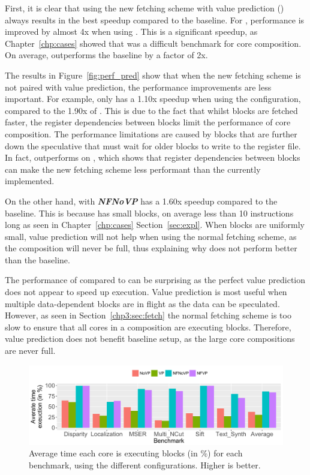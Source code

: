 First, it is clear that using the new fetching scheme with value prediction (\nfvp) always results in the best speedup compared to the baseline.
For , performance is improved by almost 4x when using \nfvp.
This is a significant speedup, as Chapter~\ref{chp:cases} showed that  was a difficult benchmark for core composition.
On average, \nfvp{} outperforms the baseline by a factor of 2x.

The results in Figure~\ref{fig:perf_pred} show that when the new fetching scheme is not paired with value prediction, the performance improvements are less important.
For example,  only has a 1.10x speedup when using the \nfnovp{} configuration, compared to the 1.90x of \nfvp{}.
This is due to the fact that whilst blocks are fetched faster, the register dependencies between blocks limit the performance of core composition.
The performance limitations are caused by blocks that are further down the speculative that must wait for older blocks to write to the register file.
In fact, \vp{} outperforms \nfnovp{} on , which shows that register dependencies between blocks can make the new fetching scheme less performant than the currently implemented.

On the other hand,  with \textbf{\textit{NFNoVP}} has a 1.60x speedup compared to the baseline.
This is because  has small blocks, on average less than 10 instructions long as seen in Chapter~\ref{chp:cases} Section~\ref{sec:expl}.
When blocks are uniformly small, value prediction will not help when using the normal fetching scheme, as the composition will never be full, thus explaining why \vp{} does not perform better than the baseline.

The performance of \vp{} compared to \novp{} can be surprising as the perfect value prediction does not appear to speed up execution.
Value prediction is most useful when multiple data-dependent blocks are in flight as the data can be speculated.
However, as seen in Section~\ref{chp3:sec:fetch} the normal fetching scheme is too slow to ensure that all cores in a composition are executing blocks.
Therefore, value prediction does not benefit baseline setup, as the large core compositions are never full.

\begin{figure}[t]
    \centering
    \includegraphics[width=1\textwidth]{chapter3/graphics/perf_av_cycle_exec.pdf}
    \caption{Average time each core is executing blocks (in \%) for each benchmark, using the different configurations. Higher is better.}
    \label{fig:perf_av_cycle}
	\vspace{1em}
\end{figure}

